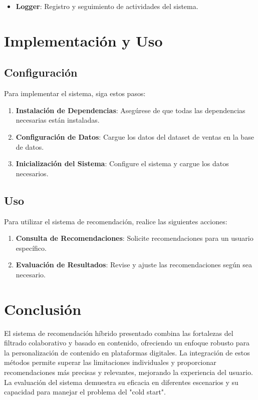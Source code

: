 \documentclass{llncs}
\begin{document}
\begin{itemize}
    \item \textbf{Logger}: Registro y seguimiento de actividades del sistema.
\end{itemize}

\section{Implementación y Uso}

\subsection{Configuración}
Para implementar el sistema, siga estos pasos:

\begin{enumerate}
    \item \textbf{Instalación de Dependencias}: Asegúrese de que todas las dependencias necesarias están instaladas.
    \item \textbf{Configuración de Datos}: Cargue los datos del dataset de ventas en la base de datos.
    \item \textbf{Inicialización del Sistema}: Configure el sistema y cargue los datos necesarios.
\end{enumerate}

\subsection{Uso}
Para utilizar el sistema de recomendación, realice las siguientes acciones:

\begin{enumerate}
    \item \textbf{Consulta de Recomendaciones}: Solicite recomendaciones para un usuario específico.
    \item \textbf{Evaluación de Resultados}: Revise y ajuste las recomendaciones según sea necesario.
\end{enumerate}

\section{Conclusión}
El sistema de recomendación híbrido presentado combina las fortalezas del filtrado colaborativo y basado en contenido, ofreciendo un enfoque robusto para la personalización de contenido en plataformas digitales. La integración de estos métodos permite superar las limitaciones individuales y proporcionar recomendaciones más precisas y relevantes, mejorando la experiencia del usuario. La evaluación del sistema demuestra su eficacia en diferentes escenarios y su capacidad para manejar el problema del "cold start".
\end{document}
